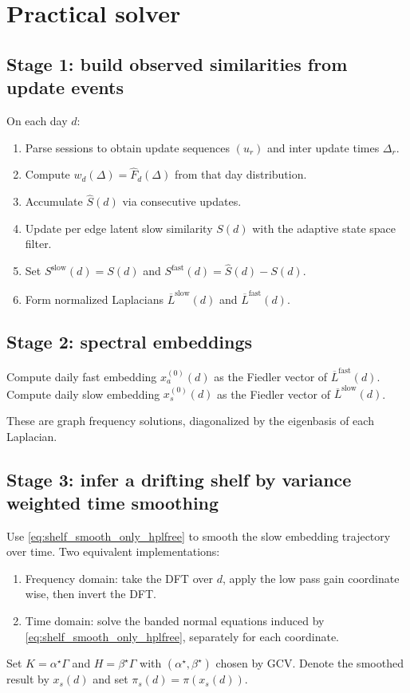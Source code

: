\documentclass[11pt]{article}
\begin{document}
\section{Practical solver}
\subsection{Stage 1: build observed similarities from update events}
On each day $d$:
\begin{enumerate}
\item Parse sessions to obtain update sequences $(u_r)$ and inter update times $\Delta_r$.
\item Compute $w_d(\Delta)=\widehat{F}_d(\Delta)$ from that day distribution.
\item Accumulate $\widehat{S}(d)$ via consecutive updates.
\item Update per edge latent slow similarity $S(d)$ with the adaptive state space filter.
\item Set $S^{\text{slow}}(d)=S(d)$ and $S^{\text{fast}}(d)=\widehat{S}(d)-S(d)$.
\item Form normalized Laplacians $\overline{L}^{\text{slow}}(d)$ and $\overline{L}^{\text{fast}}(d)$.
\end{enumerate}

\subsection{Stage 2: spectral embeddings}
Compute daily fast embedding $x_a^{(0)}(d)$ as the Fiedler vector of $\overline{L}^{\text{fast}}(d)$.
Compute daily slow embedding $x_s^{(0)}(d)$ as the Fiedler vector of $\overline{L}^{\text{slow}}(d)$.

These are graph frequency solutions, diagonalized by the eigenbasis of each Laplacian.

\subsection{Stage 3: infer a drifting shelf by variance weighted time smoothing}
Use \eqref{eq:shelf_smooth_only_hplfree} to smooth the slow embedding trajectory over time.
Two equivalent implementations:
\begin{enumerate}
\item Frequency domain: take the DFT over $d$, apply the low pass gain coordinate wise, then invert the DFT.
\item Time domain: solve the banded normal equations induced by \eqref{eq:shelf_smooth_only_hplfree}, separately for each coordinate.
\end{enumerate}
Set $K=\alpha^\star\Gamma$ and $H=\beta^\star\Gamma$ with $(\alpha^\star,\beta^\star)$ chosen by GCV.
Denote the smoothed result by $x_s(d)$ and set $\pi_s(d)=\pi(x_s(d))$.
\end{document}
